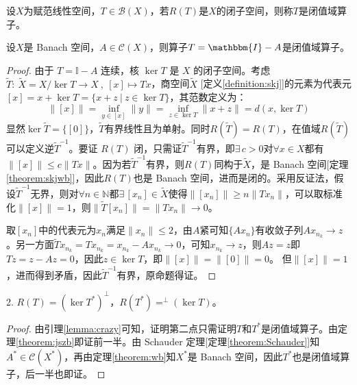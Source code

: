 \begin{definition}[闭值域算子]
设$X$为赋范线性空间，$T \in \mathscr{B}(X)$，若$R(T)$是$X$的闭子空间，则称$T$是闭值域算子。
\end{definition}
\begin{theorem}\label{theorem:jszb}
设$X$是 Banach 空间，$A \in \mathscr{C}(X)$，则算子$T=\mathbbm{I}-A$是闭值域算子。
\end{theorem}
\begin{proof}
由于 $T = \mathbb{I} - A$ 连续，核 $\ker T$ 是 $X$ 的闭子空间。考虑$\widetilde{T}: \ \widetilde{X}=X/\ker T \to X \ , \ [x] \mapsto Tx$，商空间$\widetilde{X}$ [定义\ref{definition:skj}]的元素为代表元$[x]=x+\ker T=\{x+z \ | \ z \in \ker T\}$，其范数定义为：
\[\|[x]\|=\inf_{y \in [x]}\|y\|=\inf_{z \in \ker T}\|x+z\|=d(x,\ker T)\]
显然$\ker\widetilde{T}=\{[0]\}$，$\widetilde{T}$有界线性且为单射。同时$R(\widetilde{T})=R(T)$，在值域$R(\widetilde{T})$可以定义逆$\widetilde{T}^{-1}$。要证 $R(T)$ 闭，只需证$\widetilde{T}^{-1}$有界，即$\exists \, c > 0$对$\forall x \in X$都有$\|[x]\| \le c \|Tx\|$。因为若$\widetilde{T}^{-1}$有界，则$R(T)$同构于$\widetilde{X}$，是 Banach 空间[定理\ref{theorem:skjwb}]，因此$R(T)$也是 Banach 空间，进而是闭的。采用反证法，假设$\widetilde{T}^{-1}$无界，则对$\forall n \in \mathbb{N}$都$\exists \, [x_n] \in \widetilde{X}$使得$\|[x_n]\| \ge n \|Tx_n\|$，可以取标准化$\|[x]\|=1$，则$\|\widetilde{T}[x_n]\|=\|Tx_n\| \to 0$。

取$[x_n]$中的代表元为$x_n$满足$\|x_n\| \leq 2$，由$A$紧可知$\{Ax_n\}$有收敛子列$Ax_{n_k} \to z$。另一方面$\widetilde{T}x_{n_k}=Tx_{n_k}=x_{n_k}-Ax_{n_k} \to 0$，可知$x_{n_k} \to z$，则$Az=z$即$Tz=z-Az=0$，因此$z \in \ker T$，即$\|[x]\|=\|[0]\|=0$。
但$\|[x]\|=1$，进而得到矛盾，因此$\widetilde{T}^{-1}$有界，原命题得证。
\end{proof}

\begin{proposition}\label{proposition:6-2}
2. $R(T)=(\ker T^*)^{\perp}$，$R(T^*)=^{\perp}(\ker T)$。
\end{proposition}
\begin{proof}
由引理\ref{lemma:crazy}可知，证明第二点只需证明$T$和$T^*$是闭值域算子。由定理\ref{theorem:jszb}即证前一半。由 Schauder 定理[定理\ref{theorem:Schauder}]知$A^* \in \mathscr{C}(X^*)$，再由定理\ref{theorem:wb}知$X^*$是 Banach 空间，因此$T^*$也是闭值域算子，后一半也即证。
\end{proof}

